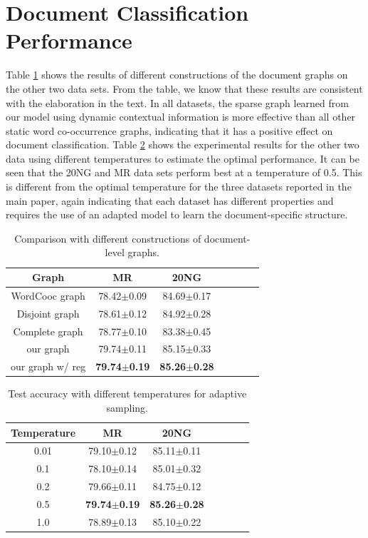 \documentclass[letterpaper]{article} %
\begin{document}
\section{Document Classification Performance}
Table \ref{textgraph} shows the results of different constructions of the document graphs on the other two data sets. From the table, we know that these results are consistent with the elaboration in the text. In all datasets, the sparse graph learned from our model using dynamic contextual information is more effective than all other static word co-occurrence graphs, indicating that it has a positive effect on document classification.
Table \ref{text temperature} shows the experimental results for the other two data using different temperatures to estimate the optimal performance. It can be seen that the 20NG and MR data sets perform best at a temperature of 0.5. This is different from the optimal temperature for the three datasets reported in the main paper, again indicating that each dataset has different properties and requires the use of an adapted model to learn the document-specific structure.

\begin{table}[t]
\centering
\begin{tabular}{c|cccccc}
\toprule
\textbf{Graph} & \textbf{MR} & \textbf{20NG}\\ \midrule\midrule
WordCooc graph & 78.42$\pm$0.09 & 84.69$\pm$0.17\\
Disjoint graph & 78.61$\pm$0.12 & 84.92$\pm$0.28\\
Complete graph & 78.77$\pm$0.10 & 83.38$\pm$0.45\\
\midrule
our graph  & 79.74$\pm$0.11 & 85.15$\pm$0.33\\
our graph w/ reg &  \textbf{79.74$\pm$0.19} & \textbf{85.26$\pm$0.28}\\
\bottomrule
\end{tabular}
\caption{Comparison with different constructions of document-level graphs.}
\label{textgraph}
\end{table}
\begin{table}[t]
\centering
\begin{tabular}{c|cccccc}
\toprule
\textbf{Temperature} & \textbf{MR} & \textbf{20NG}\\ \midrule\midrule
0.01 & 79.10$\pm$0.12 & 85.11$\pm$0.11  \\
0.1 & 78.10$\pm$0.14 & 85.01$\pm$0.32  \\
0.2 & 79.66$\pm$0.11 & 84.75$\pm$0.12  \\
0.5 & \textbf{79.74$\pm$0.19} & \textbf{85.26$\pm$0.28}  \\
1.0 & 78.89$\pm$0.13 & 85.10$\pm$0.22  \\
\bottomrule
\end{tabular}
\caption{Test accuracy with different temperatures for adaptive sampling.}
\label{text temperature}
\end{table}
\end{document}
